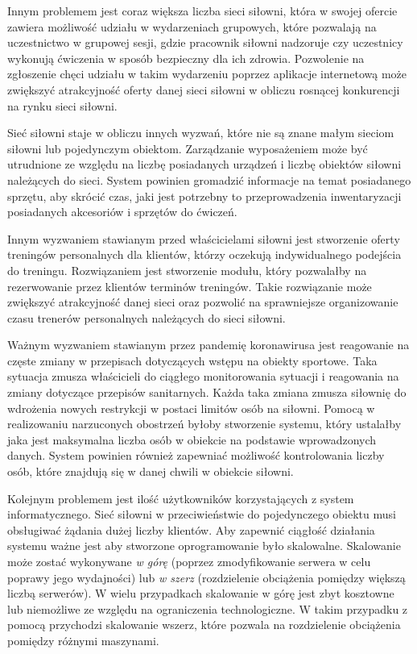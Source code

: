 \documentclass[a4paper,twoside,12pt]{book}
\begin{document}
Innym problemem jest coraz większa liczba sieci siłowni, która w swojej ofercie zawiera możliwość udziału w wydarzeniach grupowych, które pozwalają na uczestnictwo w grupowej sesji, gdzie pracownik siłowni nadzoruje czy uczestnicy wykonują ćwiczenia w sposób bezpieczny dla ich zdrowia. Pozwolenie na zgłoszenie chęci udziału w takim wydarzeniu poprzez aplikacje internetową może zwiększyć atrakcyjność oferty danej sieci siłowni w obliczu rosnącej konkurencji na rynku sieci siłowni.

Sieć siłowni staje w obliczu innych wyzwań, które nie są znane małym sieciom siłowni lub pojedynczym obiektom. Zarządzanie wyposażeniem może być utrudnione ze względu na liczbę posiadanych urządzeń i liczbę obiektów siłowni należących do sieci. System powinien gromadzić informacje na temat posiadanego sprzętu, aby skrócić czas, jaki jest potrzebny to przeprowadzenia inwentaryzacji posiadanych akcesoriów i sprzętów do ćwiczeń.

Innym wyzwaniem stawianym przed właścicielami siłowni jest stworzenie oferty treningów personalnych dla klientów, którzy oczekują indywidualnego podejścia do treningu. Rozwiązaniem jest stworzenie modułu, który pozwalałby na rezerwowanie przez klientów terminów treningów. Takie rozwiązanie może zwiększyć atrakcyjność danej sieci oraz pozwolić na sprawniejsze organizowanie czasu trenerów personalnych należących do sieci siłowni.

Ważnym wyzwaniem stawianym przez pandemię koronawirusa jest reagowanie na częste zmiany w przepisach dotyczących wstępu na obiekty sportowe. Taka sytuacja zmusza właścicieli do ciągłego monitorowania sytuacji i reagowania na zmiany dotyczące przepisów sanitarnych. Każda taka zmiana zmusza siłownię do wdrożenia nowych restrykcji w postaci limitów osób na siłowni. Pomocą w realizowaniu narzuconych obostrzeń byłoby stworzenie systemu, który ustalałby jaka jest maksymalna liczba osób w obiekcie na podstawie wprowadzonych danych. System powinien również zapewniać możliwość kontrolowania liczby osób, które znajdują się w danej chwili w obiekcie siłowni.

Kolejnym problemem jest ilość użytkowników korzystających z system informatycznego. Sieć siłowni w przeciwieństwie do pojedynczego obiektu musi obsługiwać żądania dużej liczby klientów. Aby zapewnić ciągłość działania systemu ważne jest aby stworzone oprogramowanie było skalowalne. Skalowanie może zostać wykonywane \textit{w górę} (poprzez zmodyfikowanie serwera w celu poprawy jego wydajności) lub \textit{w szerz} (rozdzielenie obciążenia pomiędzy większą liczbą serwerów)\cite{bib:mongodb_guide}. W wielu przypadkach skalowanie w górę jest zbyt kosztowne lub niemożliwe ze względu na ograniczenia technologiczne. W takim przypadku z pomocą przychodzi skalowanie wszerz, które pozwala na rozdzielenie obciążenia pomiędzy różnymi maszynami.
\end{document}
